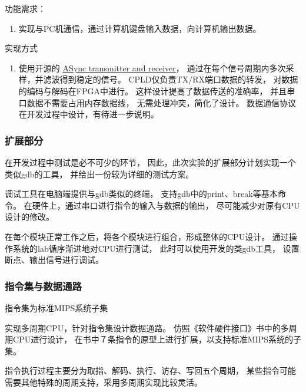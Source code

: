                 功能需求：
                \begin{enumerate}
                \item
                实现与PC机通信，通过计算机键盘输入数据，向计算机输出数据。
                \end{enumerate}

                实现方式
                \begin{enumerate}
                \item
                使用开源的%
                \href{http://www.fpga4fun.com/SerialInterface.html}{ASync transmitter and receiver}，%
                通过在每个信号周期内多次采样，并滤波得到稳定的信号。%
                CPLD仅负责TX/RX端口数据的转发，%
                对数据的编码与解码在FPGA中进行。%
                这样设计提高了数据传送的准确率，%
                并且串口数据不需要占用内存数据线，%
                无需处理冲突，简化了设计。%
                数据通信协议在开发过程中设计，有待进一步说明。

                \end{enumerate}
        \subsubsection{扩展部分}
            在开发过程中测试是必不可少的环节，%
            因此，此次实验的扩展部分计划实现一个类似gdb的工具，%
            并给出一份较为详细的测试方案。

            调试工具在电脑端提供与gdb类似的终端，%
            支持gdb中的print、break等基本命令。%
            在硬件上，通过串口进行指令的输入与数据的输出，%
            尽可能减少对原有CPU设计的修改。
            
            在每个模块正常工作之后，将各个模块进行组合，形成整体的CPU设计。%
            通过操作系统的lab循序渐进地对CPU进行测试，%
            此时可以使用开发的类gdb工具，%
            设置断点、输出信号进行调试。
            
        \subsubsection{指令集与数据通路}
            指令集为标准MIPS系统子集

            实现多周期CPU，针对指令集设计数据通路。
            仿照《软件硬件接口》书中的多周期CPU进行设计，
            在书中７条指令的原型上进行扩展，以支持标准MIPS系统的子集。
            
            指令执行过程主要分为取指、解码、执行、访存、写回五个周期，
            某些指令可能需要其他特殊的周期支持，采用多周期实现比较灵活。


